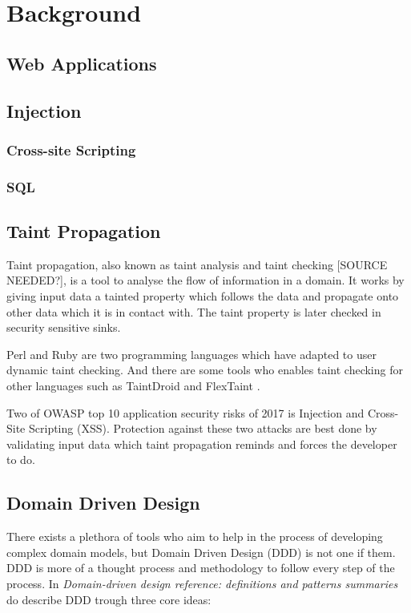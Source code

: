 \chapter{Background}


\section{Web Applications}


\section{Injection}
\subsection{Cross-site Scripting}
\subsection{SQL}


\section{Taint Propagation}
Taint propagation, also known as taint analysis and taint checking [SOURCE NEEDED?], is a tool to analyse the flow of information in a domain. \parencite{Pan2015} It works by giving input data a tainted property which follows the data and propagate onto other data which it is in contact with. The taint property is later checked in security sensitive sinks. \parencite{Pan2015} 

Perl and Ruby are two programming languages which have adapted to user dynamic taint checking. \parencite{perl, ruby} And there are some tools who enables taint checking for other languages such as TaintDroid \parencite{Ma2010} and FlexTaint \parencite{Venkataramani2008}.

Two of OWASP top 10 application security risks of 2017 is Injection and Cross-Site Scripting (XSS). \parencite{OWASP2017} Protection against these two attacks are best done by validating input data which taint propagation reminds and forces the developer to do.


\section{Domain Driven Design}
There exists a plethora of tools who aim to help in the process of developing complex domain models, but Domain Driven Design (DDD) is not one if them. \parencite{Bankes, 10.1007/978-3-319-24309-2_33} DDD is more of a thought process and methodology to follow every step of the process. \parencite{EvansEric2004Dd:t} In \emph{Domain-driven design reference: definitions and patterns summaries} do \textcite{evans_2015} describe DDD trough three core ideas:

